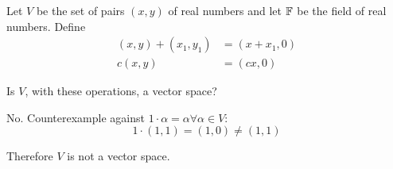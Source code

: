 \documentclass[a4paper, 11pt]{article}
\begin{document}
\begin{problem} 
Let \(V\) be the set of pairs \((x, y)\) of real numbers and let \(\mathbb{F}\) be the field of real numbers. Define
\begin{align*}
    (x, y) + (x_1, y_1) & = (x+x_1, 0) \\
    c(x, y)             & = (cx, 0)
\end{align*}

Is \(V\), with these operations, a vector space?
\end{problem}
\begin{solution}
    No. Counterexample against \(1 \cdot \alpha = \alpha \forall \alpha \in V\):
    \[
        1\cdot(1,1) = (1, 0) \neq (1, 1)
    \]
    
    Therefore \(V\) is not a vector space.
\end{solution}
\end{document}
